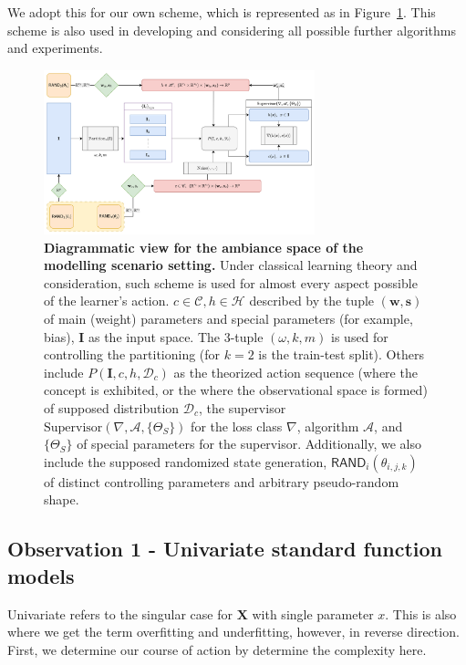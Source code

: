 \documentclass{article}
\begin{document}
We adopt this for our own scheme, which is represented as in Figure~\ref{fig:vapnik_scheme}. This scheme is also used in developing and considering all possible further algorithms and experiments. 
\begin{figure}[htb]
  \centering
  \includegraphics[width=0.7\textwidth]{Diagramatic_Modelling_View.png}
  \caption{\textbf{Diagrammatic view for the ambiance space of the modelling scenario setting.} Under classical learning theory and consideration, such scheme is used for almost every aspect possible of the learner's action. $c\in\mathcal{C}, h\in \mathcal{H}$ described by the tuple $(\mathbf{w},\mathbf{s})$ of main (weight) parameters and special parameters (for example, bias), $\mathbf{I}$ as the input space. The 3-tuple $(\omega, k,m)$ is used for controlling the partitioning (for $k=2$ is the train-test split). Others include $P(\mathbf{I},c,h,\mathcal{D}_{c})$ as the theorized action sequence (where the concept is exhibited, or the where the observational space is formed) of supposed distribution $\mathcal{D}_{c}$, the supervisor $\text{Supervisor}(\nabla, \mathcal{A}, \{\Theta_{S}\})$ for the loss class $\nabla$, algorithm $\mathcal{A}$, and $\{\Theta_{S}\}$ of special parameters for the supervisor. Additionally, we also include the supposed randomized state generation, $\mathsf{RAND}_{i}(\theta_{i,j,k})$ of distinct controlling parameters and arbitrary pseudo-random shape.}
  \label{fig:vapnik_scheme}
\end{figure}


\subsection{Observation 1 - Univariate standard function models}

Univariate refers to the singular case for $\mathbf{X}$ with single parameter $x$. This is also where we get the term overfitting and underfitting, however, in reverse direction. First, we determine our course of action by determine the complexity here. 
\end{document}
